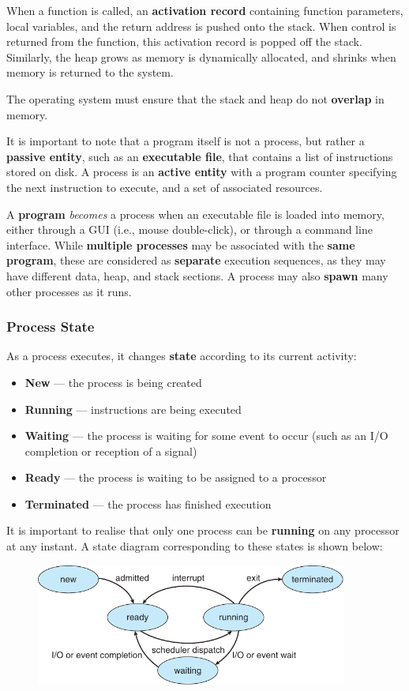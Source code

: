 \documentclass{article}
\begin{document}
When a function is called, an \textbf{activation record} containing
function parameters, local variables, and the return address is pushed
onto the stack. When control is returned from the function, this
activation record is popped off the stack. Similarly, the heap grows as
memory is dynamically allocated, and shrinks when memory is returned to
the system.

The operating system must ensure that the stack and heap do not
\textbf{overlap} in memory.

It is important to note that a program itself is not a process, but
rather a \textbf{passive entity}, such as an \textbf{executable file},
that contains a list of instructions stored on disk. A process is an
\textbf{active entity} with a program counter specifying the next
instruction to execute, and a set of associated resources.

A \textbf{program} \textit{becomes} a process when an executable file
is loaded into memory, either through a GUI (i.e., mouse double-click),
or through a command line interface. While \textbf{multiple processes}
may be associated with the \textbf{same program}, these are considered
as \textbf{separate} execution sequences, as they may have different
data, heap, and stack sections. A process may also \textbf{spawn} many
other processes as it runs.
\subsubsection{Process State}
As a process executes, it changes \textbf{state} according to its
current activity:
\begin{itemize}
    \item \textbf{New} --- the process is being created
    \item \textbf{Running} --- instructions are being executed
    \item \textbf{Waiting} --- the process is waiting for some event to
          occur (such as an I/O completion or reception of a signal)
    \item \textbf{Ready} --- the process is waiting to be assigned to a
          processor
    \item \textbf{Terminated} --- the process has finished execution
\end{itemize}
It is important to realise that only one
process can be \textbf{running} on any processor at any instant.
A state diagram corresponding to these states is shown below:
\begin{figure}[H]
    \centering
    \includegraphics[height = 4cm]{figures/process_state_diagram.pdf}
\end{figure}
\end{document}
